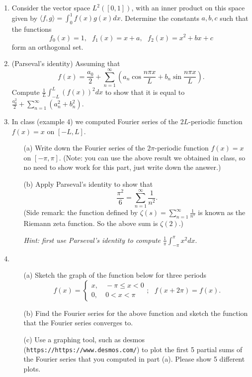 \documentclass[11pt]{article}
\theoremstyle{definition}
\begin{document}
\begin{enumerate}[leftmargin=*]
\item Consider the vector space $L^2([0,1])$, with an inner product on this space given by $\langle f, g\rangle=\int_0^1f(x)g(x)dx$.   Determine the constants $a,b,c$ such that the functions 
\[f_0(x)=1,\ \ \  f_1(x)=x+a, \ \ \ f_2(x)=x^2+bx+c\]
form an orthogonal set.\\

\item (Parseval's identity) Assuming that 
\[
f(x)=\frac{a_0}{2}+\sum_{n=1}^{\infty}\left(a_n\cos\frac{n\pi x}{L}+b_n\sin\frac{n\pi x}{L}\right).
\] Compute 
$\frac{1}{L}\int_{-L}^{L} (f(x))^2 dx$ to show that it is equal to $\frac{a_0^2}{2}+\sum_{n=1}^\infty (a_n^2+b_n^2)$.\\ 

\item In class (example 4) we computed Fourier series of the $2L$-periodic function $f(x)=x$ on $[-L, L]$.  
\begin{itemize}
\item[(a)] Write down the Fourier series of the $2\pi$-periodic function $f(x)=x$ on $[-\pi, \pi]$.  (Note: you can use the above result we obtained in class, so no need to show work for this part, just write down the answer.)\\
\item[(b)]  Apply Parseval's identity to show that 
\[\frac{\pi^2}{6}=\sum_{n=1}^\infty \frac{1}{n^2}.\]
(Side remark: the function defined by $\zeta(s)=\sum_{n=1}^\infty \frac{1}{n^s}$ is known as the Riemann zeta function.  So the above sum is $\zeta(2)$.)

\emph{Hint: first use Parseval's identity to compute $\frac{1}{\pi}\int_{-\pi}^{\pi}x^2dx.$}\\
\end{itemize}

\item 
\begin{itemize}
\item[(a)] Sketch the graph of the function below for three periods
\[
f(x)=\left\{ \begin{array}{ll}
x, & \ -\pi\leq x < 0\\
0, & \ 0< x<\pi
\end{array}\right.;
\ \ \ f(x+2\pi)=f(x).
\]
\item[(b)] Find the Fourier series for the above function and sketch the function that the Fourier series converges to.  

\item[(c)] Use a graphing tool, such as desmos (\verb+https://https://www.desmos.com/+) to plot the first 5 partial sums of the Fourier series that you computed in part (a).  Please show 5 different plots. 

\end{itemize}



\end{enumerate}
\end{document}
